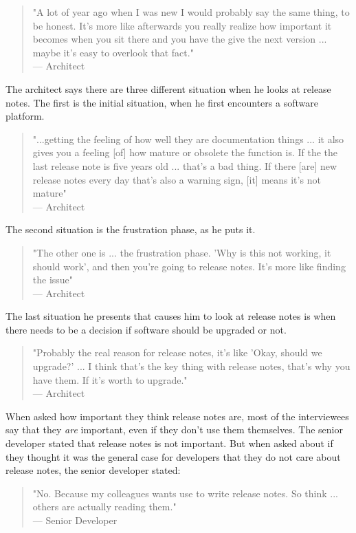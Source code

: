 \documentclass{cslthse-msc}
\begin{document}
    \begin{quote}
        "A lot of year ago when I was new I would probably say the same thing, to be honest. It's more like afterwards you really realize how important it becomes when you sit there and you have the give the next version ... maybe it's easy to overlook that fact."\\
        --- Architect
    \end{quote}
    The architect says there are three different situation when he looks at release notes. The first is the initial situation, when he first encounters a software platform.
    \begin{quote}
        "...getting the feeling of how well they are documentation things ... it also gives you a feeling [of] how mature or obsolete the function is. If the the last release note is five years old ... that's a bad thing. If there [are] new release notes every day that's also a warning sign, [it] means it's not mature" \\
        --- Architect
    \end{quote}
    The second situation is the frustration phase, as he puts it.
    \begin{quote}
        "The other one is ... the frustration phase. 'Why is this not working, it should work', and then you're going to release notes. It's more like finding the issue"\\
        --- Architect
    \end{quote}
    The last situation he presents that causes him to look at release notes is when there needs to be a decision if software should be upgraded or not.
    \begin{quote}
        "Probably the real reason for release notes, it's like 'Okay, should we upgrade?' ... I think that's the key thing with release notes, that's why you have them. If it's worth to upgrade." \\
        --- Architect
    \end{quote}
    When asked how important they think release notes are, most of the interviewees say that they \textit{are} important, even if they don't use them themselves. The senior developer stated that release notes is not important. But when asked about if they thought it was the general case for developers that they do not care about release notes, the senior developer stated:
    \begin{quote}
        "No. Because my colleagues wants use to write release notes. So think ... others are actually reading them."\\ --- Senior Developer
    \end{quote}
\end{document}
